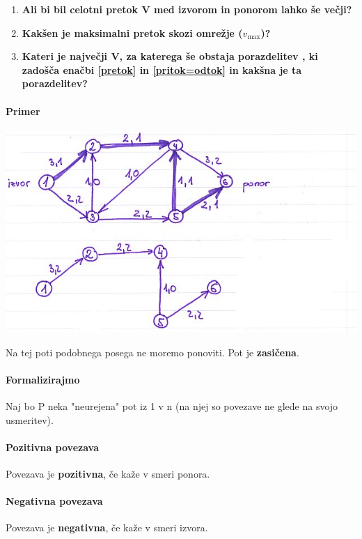 \documentclass[a4paper,10pt]{article}
\begin{document}
\begin{enumerate}
\item \textbf{Ali bi bil celotni pretok V med izvorom in ponorom lahko \v se ve\v cji?}
\item \textbf{Kak\v sen je maksimalni pretok skozi omre\v zje ($v_{\mbox{max}}$)?}
\item \textbf{Kateri je najve\v cji V, za katerega \v se obstaja porazdelitev , ki zado\v s\v ca ena\v cbi \ref{pretok} in \ref{pritok=odtok} in kak\v sna je ta porazdelitev?}
\end{enumerate}

\paragraph{Primer}
	\begin{center}
	\includegraphics{Slike/MinPretokPrimer.jpg}
	\end{center}
Na tej poti podobnega posega ne moremo ponoviti. Pot je \textbf{zasi\v cena}.

\paragraph{Formalizirajmo}
Naj bo P neka "neurejena" pot iz 1 v n (na njej so povezave ne glede na svojo usmeritev).

\paragraph{Pozitivna povezava}
Povezava je \textbf{pozitivna}, \v ce ka\v ze v smeri ponora.

\paragraph{Negativna povezava}
Povezava je \textbf{negativna}, \v ce ka\v ze v smeri izvora.
\end{document}
